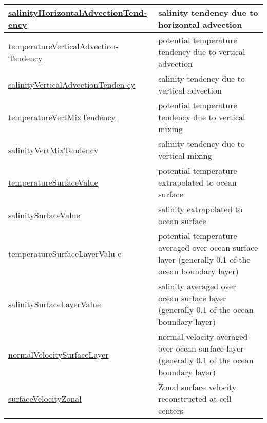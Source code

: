 {\begin{center}
\begin{longtable}{| p{2.0in} | p{4.0in} |}
    \hline
    \hyperref[subsec:var_sec_diagnostics_salinityHorizontalAdvectionTendency]{salinityHorizontalAdvectionTend-}\hyperref[subsec:var_sec_diagnostics_salinityHorizontalAdvectionTendency]{ency}  & salinity tendency due to horizontal advection \\
    \hline
    \hyperref[subsec:var_sec_diagnostics_temperatureVerticalAdvectionTendency]{temperatureVerticalAdvection-}\hyperref[subsec:var_sec_diagnostics_temperatureVerticalAdvectionTendency]{Tendency}  & potential temperature tendency due to vertical advection \\
    \hline
    \hyperref[subsec:var_sec_diagnostics_salinityVerticalAdvectionTendency]{salinityVerticalAdvectionTenden-}\hyperref[subsec:var_sec_diagnostics_salinityVerticalAdvectionTendency]{cy}  & salinity tendency due to vertical advection \\
    \hline
    \hyperref[subsec:var_sec_diagnostics_temperatureVertMixTendency]{temperatureVertMixTendency} & potential temperature tendency due to vertical mixing \\
    \hline
    \hyperref[subsec:var_sec_diagnostics_salinityVertMixTendency]{salinityVertMixTendency} & salinity tendency due to vertical mixing \\
    \hline
    \hyperref[subsec:var_sec_diagnostics_temperatureSurfaceValue]{temperatureSurfaceValue} & potential temperature extrapolated to ocean surface \\
    \hline
    \hyperref[subsec:var_sec_diagnostics_salinitySurfaceValue]{salinitySurfaceValue} & salinity extrapolated to ocean surface \\
    \hline
    \hyperref[subsec:var_sec_diagnostics_temperatureSurfaceLayerValue]{temperatureSurfaceLayerValu-}\hyperref[subsec:var_sec_diagnostics_temperatureSurfaceLayerValue]{e}  & potential temperature averaged over ocean surface layer (generally 0.1 of the ocean boundary layer) \\
    \hline
    \hyperref[subsec:var_sec_diagnostics_salinitySurfaceLayerValue]{salinitySurfaceLayerValue} & salinity averaged over ocean surface layer (generally 0.1 of the ocean boundary layer) \\
    \hline
    \hyperref[subsec:var_sec_diagnostics_normalVelocitySurfaceLayer]{normalVelocitySurfaceLayer} & normal velocity averaged over ocean surface layer (generally 0.1 of the ocean boundary layer) \\
    \hline
    \hyperref[subsec:var_sec_diagnostics_surfaceVelocityZonal]{surfaceVelocityZonal} & Zonal surface velocity reconstructed at cell centers \\

\end{longtable}
\end{center}}
